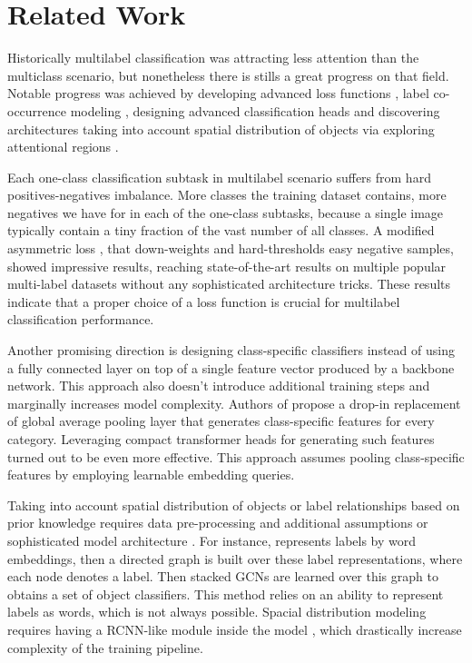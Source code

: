 \documentclass[runningheads]{llncs}
\begin{document}
\section{Related Work}
Historically multilabel classification was attracting less attention than the multiclass scenario,
but nonetheless there is stills a great progress on that field. Notable progress was achieved by
developing advanced loss functions \cite{Baruch2021AsymmetricLF}, label co-occurrence modeling \cite{Chen2019MultiLabelIR, Yuan2022GraphAT},
designing advanced classification heads \cite{Liu2021Query2LabelAS, ridnik2021mldecoder, resAttn} and discovering
architectures taking into account spatial distribution of objects via exploring attentional regions
\cite{Wang2017MultilabelIR, Gao2021LearningTD}.

Each one-class classification subtask in multilabel scenario suffers from hard positives-negatives imbalance.
More classes the training dataset contains, more negatives we have for in each of the one-class subtasks, because
a single image typically contain a tiny fraction of the vast number of all classes. A modified asymmetric loss \cite{Baruch2021AsymmetricLF},
that down-weights and hard-thresholds easy negative samples, showed impressive results, reaching state-of-the-art results on multiple popular
multi-label datasets without any sophisticated architecture tricks. These results indicate that a proper choice of a loss
function is crucial for multilabel classification performance.

Another promising direction is designing class-specific classifiers instead of using a fully connected
layer on top of a single feature vector produced by a backbone network. This approach
also doesn't introduce additional training steps and marginally increases model complexity.
Authors of \cite{resAttn} propose a drop-in replacement of global average pooling layer that
generates class-specific features for every category. Leveraging compact transformer heads for
generating such features \cite{Liu2021Query2LabelAS, ridnik2021mldecoder} turned out to be even more
effective. This approach assumes pooling class-specific features by employing learnable embedding queries.

Taking into account spatial distribution of objects or label relationships based on prior knowledge requires
data pre-processing and additional assumptions \cite{Chen2019MultiLabelIR, Yuan2022GraphAT} or
sophisticated model architecture \cite{Wang2017MultilabelIR, Gao2021LearningTD}.
For instance, \cite{Chen2019MultiLabelIR} represents labels by word embeddings, then a directed graph is built over these label
representations, where each node denotes a label. Then stacked GCNs are learned over this graph to obtains a
set of object classifiers. This method relies on an ability to represent labels as words, which is not always possible.
Spacial distribution modeling requires having a RCNN-like \cite{Girshick2014RichFH}
module inside the model \cite{Wang2017MultilabelIR, Gao2021LearningTD}, which drastically increase
complexity of the training pipeline.
\end{document}
